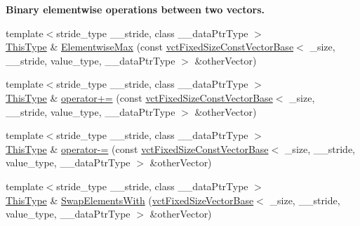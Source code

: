 \begin{Indent}{\bf Binary elementwise operations between two vectors.}
\begin{DoxyCompactItemize}
\item 
{\footnotesize template$<$stride\-\_\-type \-\_\-\-\_\-stride, class \-\_\-\-\_\-data\-Ptr\-Type $>$ }\\\hyperlink{classvct_fixed_size_const_vector_base_a071063bc4fa43112cc287b2dbef53180}{This\-Type} \& \hyperlink{classvct_fixed_size_vector_base_a4d59599557e4ac13451040ed04c9e858}{Elementwise\-Max} (const \hyperlink{classvct_fixed_size_const_vector_base}{vct\-Fixed\-Size\-Const\-Vector\-Base}$<$ \-\_\-size, \-\_\-\-\_\-stride, value\-\_\-type, \-\_\-\-\_\-data\-Ptr\-Type $>$ \&other\-Vector)
\item 
{\footnotesize template$<$stride\-\_\-type \-\_\-\-\_\-stride, class \-\_\-\-\_\-data\-Ptr\-Type $>$ }\\\hyperlink{classvct_fixed_size_const_vector_base_a071063bc4fa43112cc287b2dbef53180}{This\-Type} \& \hyperlink{classvct_fixed_size_vector_base_a6aa23ed49a0ba665318c8d90c9a1c90e}{operator+=} (const \hyperlink{classvct_fixed_size_const_vector_base}{vct\-Fixed\-Size\-Const\-Vector\-Base}$<$ \-\_\-size, \-\_\-\-\_\-stride, value\-\_\-type, \-\_\-\-\_\-data\-Ptr\-Type $>$ \&other\-Vector)
\item 
{\footnotesize template$<$stride\-\_\-type \-\_\-\-\_\-stride, class \-\_\-\-\_\-data\-Ptr\-Type $>$ }\\\hyperlink{classvct_fixed_size_const_vector_base_a071063bc4fa43112cc287b2dbef53180}{This\-Type} \& \hyperlink{classvct_fixed_size_vector_base_ad4dd5c63d761584d50ee702aa4a5393c}{operator-\/=} (const \hyperlink{classvct_fixed_size_const_vector_base}{vct\-Fixed\-Size\-Const\-Vector\-Base}$<$ \-\_\-size, \-\_\-\-\_\-stride, value\-\_\-type, \-\_\-\-\_\-data\-Ptr\-Type $>$ \&other\-Vector)
\item 
{\footnotesize template$<$stride\-\_\-type \-\_\-\-\_\-stride, class \-\_\-\-\_\-data\-Ptr\-Type $>$ }\\\hyperlink{classvct_fixed_size_const_vector_base_a071063bc4fa43112cc287b2dbef53180}{This\-Type} \& \hyperlink{classvct_fixed_size_vector_base_a8fe3d33f9d54a8ee457d8d4638765d61}{Swap\-Elements\-With} (\hyperlink{classvct_fixed_size_vector_base}{vct\-Fixed\-Size\-Vector\-Base}$<$ \-\_\-size, \-\_\-\-\_\-stride, value\-\_\-type, \-\_\-\-\_\-data\-Ptr\-Type $>$ \&other\-Vector)
\end{DoxyCompactItemize}
\end{Indent}
